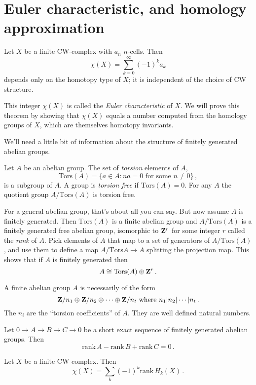 \section{Euler characteristic, and homology approximation}


\begin{theorem} Let $X$ be a finite CW-complex with $a_n$ $n$-cells. Then 
\[
\chi(X)=\sum^\infty_{k=0}(-1)^k a_k
\]
depends only on the homotopy type of $X$; it is independent of the choice of
CW structure. 
\end{theorem}
This integer $\chi(X)$ is called the {\em Euler characteristic} of $X$. We will prove this theorem by showing that $\chi(X)$ equals a number computed from the homology groups of $X$, which are themselves homotopy invariants. 

We'll need a little bit of information about the structure of finitely generated abelian groups.

Let $A$ be an abelian group. The set of {\em torsion} elements of $A$,
\[
\mathrm{Tors}(A)=\{a\in A:na=0\,\,\text{for some}\,\,n\neq0\}\,,
\]
is a subgroup of $A$. A group is \emph{torsion free}
if $\mathrm{Tors}(A)=0$. For any $A$ the quotient group 
$A/\mathrm{Tors}(A)$ is torsion free. 

For a general abelian group, that's about all you can say. But now assume $A$ is finitely generated. Then $\mathrm{Tors}(A)$ is a finite abelian group and
$A/\mathrm{Tors}(A)$ is a finitely generated free abelian group, isomorphic to $\mathbf Z^r$ for some integer $r$ called the \emph{rank} of $A$. Pick elements of
$A$ that map to a set of generators of $A/\mathrm{Tors}(A)$, and use them
to define a map $A/\mathrm{Tors}A\to A$ splitting the projection map. This shows that if $A$ is finitely generated then
\[
A\cong\mathrm{Tors}(A)\oplus\mathbf Z^r\,.
\]

A finite abelian group $A$ is necessarily of the form 
\[
\mathbf Z/n_1\oplus\mathbf Z/n_2\oplus\cdots\oplus\mathbf Z/n_t\,\,\hbox{where}\,\,
n_1|n_2|\cdots|n_t\,.
\]
The $n_i$ are the ``torsion coefficients'' of $A$. 
They are well defined natural numbers.

\begin{lemma} Let $0\to A\to B\to C\to 0$ be a short exact sequence of finitely
generated abelian groups. Then
\[
\mathrm{rank}\,A-\mathrm{rank}\,B+\mathrm{rank}\,C=0\,.
\]
\end{lemma}

\begin{theorem} Let $X$ be a finite CW complex. Then
\[
\chi(X)=\sum_k(-1)^k\mathrm{rank}\,H_k(X)\,.
\]
\end{theorem}

